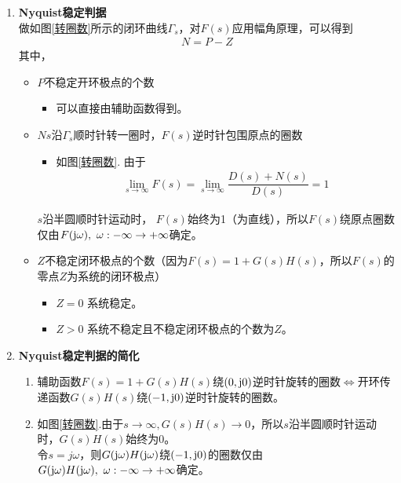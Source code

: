 \begin{enumerate}[1.]
\item \textbf{Nyquist稳定判据}\\
	\hspace*{2em} 做如图\ref{转圈数}所示的闭环曲线$\varGamma_s$，对$F(s)$应用幅角原理，可以得到
	\begin{align}
		N = P - Z
	\end{align}
	其中，
	\begin{itemize}
		\item $P$\quad 不稳定开环极点的个数
		\begin{itemize}
			\item 可以直接由辅助函数得到。
		\end{itemize}
		\item $N$\quad $s$沿$\Gamma_s$顺时针转一圈时，$F(s)$逆时针包围原点的圈数
		\begin{itemize}
			\item 如图\ref{转圈数}. 由于
			\begin{align*}
				\lim\limits_{s \to \infty} F(s) = \lim\limits_{s \to \infty} \dfrac{D(s) + N(s)}{D(s)} = 1
			\end{align*}
		\end{itemize}
		$s$沿半圆顺时针运动时， $F(s)$始终为1（为直线），所以$F(s)$绕原点圈数仅由$F(\text{j} \omega), \,\, \omega : -\infty \to +\infty$确定。
			
		
		\item $Z$\quad 不稳定闭环极点的个数（因为$F(s) = 1 + G(s)H(s)$，所以$F(s)$的零点$Z$为系统的闭环极点）
		\begin{itemize}
			\item $Z=0$ \quad 系统稳定。
			\item $Z>0$ \quad 系统不稳定且不稳定闭环极点的个数为$Z$。
		\end{itemize}
	\end{itemize}
	
\item \textbf{Nyquist稳定判据的简化}
	\begin{enumerate}[(1) ]
		\item 辅助函数$F(s) = 1 + G(s)H(s)$绕$(0,\text{j} 0)$逆时针旋转的圈数$\Longleftrightarrow$开环传递函数$G(s)H(s)$绕$(-1,\text{j} 0)$逆时针旋转的圈数。
		
		\item 如图\ref{转圈数}.由于$s\to \infty, G(s)H(s) \to 0$，所以$s$沿半圆顺时针运动时，$G(s)H(s)$始终为0。\\
		令$s = j \omega $，则$G(\text{j} \omega )H(\text{j} \omega)$绕$(-1,\text{j} 0)$的圈数仅由$G(\text{j} \omega)H(\text{j} \omega), \,\, \omega : -\infty \to +\infty$确定。
		

\end{enumerate}
\end{enumerate}
